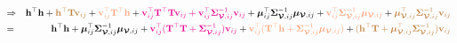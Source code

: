 \documentclass[12pt]{article}
\newcommand{\0}{\mathbf{0}}
\begin{document}
\begin{eqnarray*}
& \Rightarrow & \mathbf{h}^{\top} \mathbf{h} + \textcolor{brown}{\mathbf{h}^{\top} \mathbf{T} \mathbf{v}_{ij}} + \textcolor{lightsalmon}{\mathbf{v}_{ij}^{\top} \mathbf{T}^{\top} \mathbf{h}} + \textcolor{magenta}{ \mathbf{v}_{ij}^{\top}  \mathbf{T}^{\top} \mathbf{T} \mathbf{v}_{ij} + \mathbf{v}_{ij}^{\top} \boldsymbol{\Sigma}_{\boldsymbol{\mathcal{V}}, ij}^{-1} \mathbf{v}_{ij} } + \boldsymbol{\mu}_{ij}^{\top} \boldsymbol{\Sigma}_{\boldsymbol{\mathcal{V}}, ij}^{-1} \boldsymbol{\mu}_{\boldsymbol{\mathcal{V}}, ij} + \textcolor{lightsalmon}{\mathbf{v}_{ij}^{\top} \boldsymbol{\Sigma}_{\boldsymbol{\mathcal{V}}, ij}^{-1} \boldsymbol{\mu}_{\boldsymbol{\mathcal{V}}, ij}} + \textcolor{brown}{\boldsymbol{\mu}_{\boldsymbol{\mathcal{V}}, ij}^{\top} \boldsymbol{\Sigma}_{\boldsymbol{\mathcal{V}}, ij}^{-1} \mathbf{v}_{ij}} \\
& = & \mathbf{h}^{\top} \mathbf{h} + \boldsymbol{\mu}_{ij}^{\top} \boldsymbol{\Sigma}_{\boldsymbol{\mathcal{V}}, ij}^{-1} \boldsymbol{\mu}_{\boldsymbol{\mathcal{V}}, ij} + \textcolor{magenta}{ \mathbf{v}_{ij}^{\top} ( \mathbf{T}^{\top} \mathbf{T} + \boldsymbol{\Sigma}_{\boldsymbol{\mathcal{V}}, ij}^{-1} ) \mathbf{v}_{ij} } + \textcolor{lightsalmon}{\mathbf{v}_{ij}^{\top} ( \mathbf{T}^{\top} \mathbf{h} + \boldsymbol{\Sigma}_{\boldsymbol{\mathcal{V}}, ij}^{-1}\boldsymbol{\mu}_{\boldsymbol{\mathcal{V}}, ij} )  } +  \textcolor{brown}{( \mathbf{h}^{\top} \mathbf{T} + \boldsymbol{\mu}_{\boldsymbol{\mathcal{V}}, ij}^{\top} \boldsymbol{\Sigma}_{\boldsymbol{\mathcal{V}}, ij}^{-1}) \mathbf{v}_{ij}} 
\end{eqnarray*} 
\end{document}
